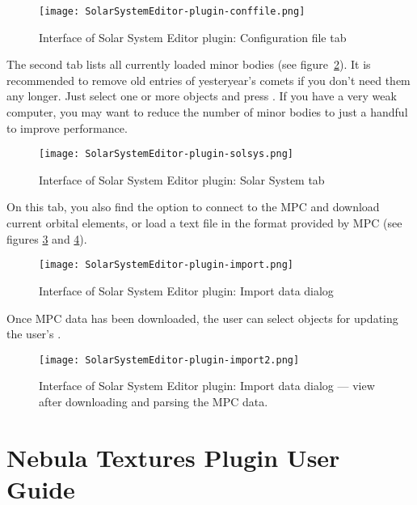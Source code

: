\begin{figure}[tbh]\centering
	\texttt{[image: SolarSystemEditor-plugin-conffile.png]}
	\caption{Interface of Solar System Editor plugin: Configuration file tab}
	\label{fig:SolarSystemEditor:ConfigurationFile}
\end{figure}

The second tab lists all currently loaded minor bodies (see figure~\ref{fig:SolarSystemEditor:SolarSystem}).  It is recommended
to remove old entries of yesteryear's comets if you don't need them any
longer. Just select one or more objects and press .
If you have a very weak computer, you may want to reduce the number of
minor bodies to just a handful to improve performance.

\begin{figure}[tbh]\centering
	\texttt{[image: SolarSystemEditor-plugin-solsys.png]}
	\caption{Interface of Solar System Editor plugin: Solar System tab}
	\label{fig:SolarSystemEditor:SolarSystem}
\end{figure}

On this tab, you also find the option to connect to the MPC and download current orbital elements, 
or load a text file in the format provided by MPC (see figures \ref{fig:SolarSystemEditor:ImportData:InitialView} and \ref{fig:SolarSystemEditor:ImportData:FinalView}). 

\begin{figure}[tbph]\centering
\texttt{[image: SolarSystemEditor-plugin-import.png]}
\caption{Interface of Solar System Editor plugin: Import data dialog}
\label{fig:SolarSystemEditor:ImportData:InitialView}
\end{figure}

Once MPC data has been downloaded, the user can select objects for updating the user's .

\begin{figure}[tbph]\centering
\texttt{[image: SolarSystemEditor-plugin-import2.png]}
\caption{Interface of Solar System Editor plugin: Import data dialog --- view after downloading and parsing the MPC data.}
\label{fig:SolarSystemEditor:ImportData:FinalView}
\end{figure}

\newpage


\clearpage

\section{Nebula Textures Plugin User Guide}
\label{sec:plugins:NebulaTextures}

